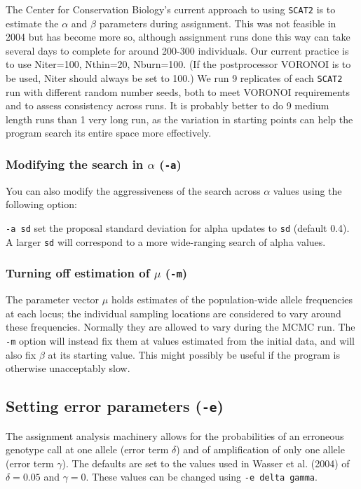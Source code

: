 \documentclass[10pt,titlepage,times,letterpaper]{article}
\def\SCAT{{\tt SCAT2} }
\begin{document}
The Center for Conservation Biology's current approach
to using \SCAT is to estimate the $\alpha$ and $\beta$ parameters during
assignment.  This was not feasible in 2004 but has become more so, although
assignment runs done this way can take several days to complete for around
200-300 individuals.  Our current practice is to use Niter=100, Nthin=20,
Nburn=100.  (If the postprocessor VORONOI is to be used, Niter should
always be set to 100.)  We run 9 replicates of each \SCAT run with
different random number seeds, both to meet VORONOI requirements and
to assess consistency across runs.  It is probably better to do 9
medium length runs than 1 very long run, as the variation in starting
points can help the program search its entire space more effectively.

\subsubsection{Modifying the search in $\alpha$  ({\tt -a})}

You can also modify the aggressiveness of the search across $\alpha$
values using the following option:

{\tt -a sd} set the proposal standard deviation for alpha updates to
{\tt sd} (default 0.4).  A larger {\tt sd} will correspond to a more
wide-ranging search of alpha values.

\subsubsection{Turning off estimation of $\mu$ ({\tt -m})}

The parameter vector $\mu$ holds estimates of the population-wide
allele frequencies at each locus; the individual sampling locations
are considered to vary around these frequencies.  Normally they
are allowed to vary during the MCMC run.  The {\tt -m} option
will instead fix them at values estimated from the initial data,
and will also fix $\beta$ at its starting value.
This might possibly be useful if the program is otherwise
unacceptably slow.

\subsection{Setting error parameters ({\tt -e})}

The assignment analysis machinery allows for the probabilities
of an erroneous genotype call at one allele
(error term $\delta$) and of amplification of only one allele (error term
$\gamma$).  The defaults are set to the values used in Wasser et al. (2004)
of $\delta = 0.05$ and $\gamma = 0$.  These values can be changed
using {\tt -e delta gamma}.
\end{document}
